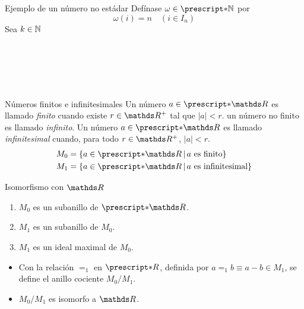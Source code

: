 \documentclass{beamer}
\begin{document}
\begin{frame}{Ejemplo de un número no estádar}
  Defínase $\omega \in \st{\N}$ por
  \[\omega(i) = n\quad (i\in I_n)\]
  Sea $k\in\mathbb{N}$
  \begin{longderivation}
      \\
    \equiv\\
      \\
    \equiv\\
  \end{longderivation}
\end{frame}
\begin{frame}{Números finitos e infinitesimales}
    Un número $a\in\st{\R}$ es llamado \emph{finito} cuando existe
    $r\in\R^+$ tal que $|a|<r$. un número no finito es llamado \emph{infinito}.
    Un número $a\in\st{\R}$ es llamado \emph{infinitesimal} cuando,
    para todo $r\in\R^+$, $|a|<r$.
    \begin{align*}
      M_0 &= \set{a\in\st{\R}}{a \text{ es finito}}\\
      M_1 &= \set{a\in\st{\R}}{a \text{ es infinitesimal}}
    \end{align*}
\end{frame}{Isomorfismo con $\R$}
  \begin{enumerate}
    \item $M_0$ es un subanillo de $\st{\R}$.
    \item $M_1$ es un subanillo de $M_0$.
    \item $M_1$ es un ideal maximal de $M_0$.
  \end{enumerate}
  \begin{itemize}
    \item Con la relación $=_1$ en $\st{R}$, definida por
          $a=_1b \equiv a-b\in M_1$, se define el anillo cociente
          $M_0/M_1$.
    \item $M_0/M_1$ es isomorfo a $\R$.
  \end{itemize}
\end{document}
